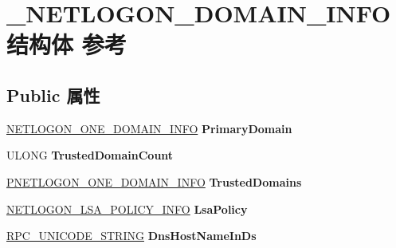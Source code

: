 \hypertarget{struct___n_e_t_l_o_g_o_n___d_o_m_a_i_n___i_n_f_o}{}\section{\+\_\+\+N\+E\+T\+L\+O\+G\+O\+N\+\_\+\+D\+O\+M\+A\+I\+N\+\_\+\+I\+N\+F\+O结构体 参考}
\label{struct___n_e_t_l_o_g_o_n___d_o_m_a_i_n___i_n_f_o}
\subsection*{Public 属性}
\begin{DoxyCompactItemize}
\item 
\mbox{\label{struct___n_e_t_l_o_g_o_n___d_o_m_a_i_n___i_n_f_o_a9ba691245b09338894cfaaeccf7d0c0a}} 
\hyperlink{struct___n_e_t_l_o_g_o_n___o_n_e___d_o_m_a_i_n___i_n_f_o}{N\+E\+T\+L\+O\+G\+O\+N\+\_\+\+O\+N\+E\+\_\+\+D\+O\+M\+A\+I\+N\+\_\+\+I\+N\+FO} {\bfseries Primary\+Domain}
\item 
\mbox{\label{struct___n_e_t_l_o_g_o_n___d_o_m_a_i_n___i_n_f_o_a14ae4f7fb6c967c8a313716d5959a8fe}} 
U\+L\+O\+NG {\bfseries Trusted\+Domain\+Count}
\item 
\mbox{\label{struct___n_e_t_l_o_g_o_n___d_o_m_a_i_n___i_n_f_o_ae723f53786753605b11b9f7c0c246fad}} 
\hyperlink{struct___n_e_t_l_o_g_o_n___o_n_e___d_o_m_a_i_n___i_n_f_o}{P\+N\+E\+T\+L\+O\+G\+O\+N\+\_\+\+O\+N\+E\+\_\+\+D\+O\+M\+A\+I\+N\+\_\+\+I\+N\+FO} {\bfseries Trusted\+Domains}
\item 
\mbox{\label{struct___n_e_t_l_o_g_o_n___d_o_m_a_i_n___i_n_f_o_a22581794f6f6b3a4ee5710ddf9fa596d}} 
\hyperlink{struct___n_e_t_l_o_g_o_n___l_s_a___p_o_l_i_c_y___i_n_f_o}{N\+E\+T\+L\+O\+G\+O\+N\+\_\+\+L\+S\+A\+\_\+\+P\+O\+L\+I\+C\+Y\+\_\+\+I\+N\+FO} {\bfseries Lsa\+Policy}
\item 
\mbox{\label{struct___n_e_t_l_o_g_o_n___d_o_m_a_i_n___i_n_f_o_acfd1636ace049506f7533d5a3fec8d4c}} 
\hyperlink{struct___r_p_c___u_n_i_c_o_d_e___s_t_r_i_n_g}{R\+P\+C\+\_\+\+U\+N\+I\+C\+O\+D\+E\+\_\+\+S\+T\+R\+I\+NG} {\bfseries Dns\+Host\+Name\+In\+Ds}

\end{DoxyCompactItemize}
